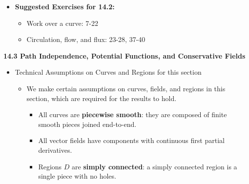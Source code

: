 \documentclass[12pt]{article}
\theoremstyle{plain}
\theoremstyle{definition}
\theoremstyle{remark}
\begin{document}
\begin{itemize}
	\item \textbf{Suggested Exercises for 14.2:}
	
		\begin{itemize}
		\item Work over a curve: 7-22
		\item Circulation, flow, and flux: 23-28, 37-40
		\end{itemize}
		
	\end{itemize}
	
	\newpage
	
	\centerline{\bf 14.3 Path Independence, Potential Functions, and Conservative Fields}
	
	\begin{itemize}
		
	\item Technical Assumptions on Curves and Regions for this section
	
		\begin{itemize}
		\item We make certain assumptions on curves, fields, and regions in this section, which are required for the results to hold.
			\begin{itemize}
			\item All curves are \textbf{piecewise smooth}: they are composed of finite smooth pieces joined end-to-end.
			\item All vector fields have components with continuous first partial derivatives.
			\item Regions $D$ are \textbf{simply connected}: a simply connected region is a single piece with no holes.
			\end{itemize}
		\end{itemize}
		

\end{itemize}
\end{document}

